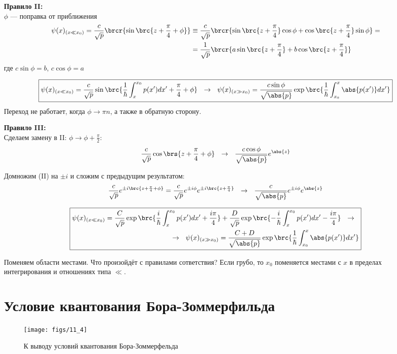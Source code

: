 \textbf{Правило II:} \\
$\phi$ --- поправка от приближения
$$
\begin{aligned}
\psi(x)_{(x \ll x_0)} = \frac{c}{\sqrt{p}} \brcr{\sin\brc{z+\frac{\pi}{4}+\phi}} &\equiv
\frac{c}{\sqrt{p}} \brcr{\sin\brc{z+\frac{\pi}{4}}\cos{\phi} + \cos\brc{z+\frac{\pi}{4}}\sin{\phi}} =\\
&=\frac{1}{\sqrt{p}} \brcr{a \sin\brc{z+\frac{\pi}{4}} + b \cos\brc{z+\frac{\pi}{4}}}
\end{aligned}
$$
где $c\sin{\phi}=b$, $c\cos{\phi}=a$

$$
\boxed{
	\psi(x)_{(x \ll x_0)} = \frac{c}{\sqrt{p}} \sin\brc{\frac{1}{\hbar} \int_{x}^{x_0} p(x')dx' + \frac{\pi}{4} + \phi} ~~\rightarrow~~
	\psi(x)_{(x \gg x_0)} = \frac{c \sin{\phi}}{\sqrt{\abs{p}}} \exp\brc{\frac{1}{\hbar} \int_{x_0}^{x} \abs{p(x')}dx'}
}
$$
Переход не работает, когда $\phi \to \pi n$, а также в обратную сторону.

\textbf{Правило III:} \\
Сделаем замену в II: $\phi \to \phi + \frac{\pi}{2}$:
$$
\frac{c}{\sqrt{p}}\cos\brs{z+\frac{\pi}{4} + \phi} ~~\rightarrow~~ \frac{c\cos{\phi}}{\sqrt{\abs{p}}} e^{\abs{z}}
$$

Домножим (II) на $\pm i$ и сложим с предыдущим результатом:
$$
\frac{c}{\sqrt{p}} e^{\pm i\brc{z+\frac{\pi}{4}+\phi}} = \frac{c}{\sqrt{p}} e^{\pm i \phi} e^{\pm i\brc{z+\frac{\pi}{4}}} ~~\rightarrow~~
\frac{c}{\sqrt{\abs{p}}} e^{\pm i \phi} e^{\abs{z}}
$$

$$
\boxed{
\begin{aligned}
	\psi(x)_{(x \ll x_0)} = \frac{C}{\sqrt{p}} \exp\brc{\frac{i}{\hbar} \int_{x}^{x_0} p(x')dx' + \frac{i\pi}{4}} 
	+ \frac{D}{\sqrt{p}} \exp\brc{-\frac{i}{\hbar} \int_{x}^{x_0} p(x')dx' - \frac{i\pi}{4}} ~~\rightarrow~~ \\
	~~\rightarrow~~ \psi(x)_{(x \gg x_0)} = \frac{C+D}{\sqrt{\abs{p}}} \exp\brc{\frac{1}{\hbar} \int_{x_0}^{x} \abs{p(x')}dx'}
\end{aligned}
}
$$

Поменяем области местами. Что произойдёт с правилами сответствия? Если грубо, то $x_0$ поменяется местами с $x$ в пределах интегрирования и отношениях типа $\ll$.


\section{Условие квантования Бора-Зоммерфильда}

\begin{figure}[h]
\centering
\texttt{[image: figs/11\_4]}
\caption{К выводу условий квантования Бора-Зоммерфельда}
\label{fig:11_4}
\end{figure}


